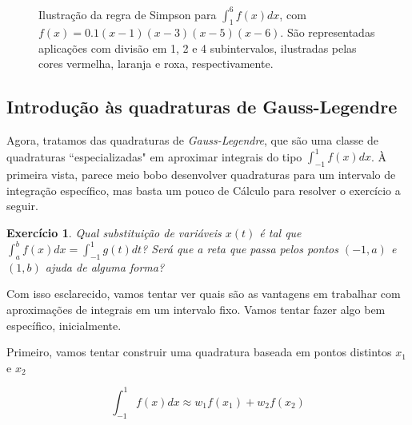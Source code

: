 \documentclass[]{article}
\newtheorem{exercicio}{Exercício}
\numberwithin{equation}{section}
\begin{document}
\begin{figure}
{
  }
  \caption{Ilustração da regra de Simpson para $\int_1^6 f(x)dx$, com
    $f(x) = 0.1(x - 1)(x - 3)(x - 5)(x - 6)$.  São representadas
    aplicações com divisão em 1, 2 e 4 subintervalos, ilustradas pelas
    cores vermelha, laranja e roxa, respectivamente.}
\end{figure}

\subsection{Introdução às quadraturas de Gauss-Legendre}

Agora, tratamos das quadraturas de \emph{Gauss-Legendre}, que são uma
classe de quadraturas ``especializadas" em aproximar integrais do tipo
$\int_{-1}^{1} f(x) dx$. À primeira vista, parece meio bobo
desenvolver quadraturas para um intervalo de integração específico,
mas basta um pouco de Cálculo para resolver o exercício a seguir.

\begin{exercicio}
  Qual substituição de variáveis $x(t)$ é tal que
  $\int_{a}^{b} f(x) dx = \int_{-1}^{1} g(t) dt$? Será que a reta que
  passa pelos pontos $(-1, a)$ e $(1, b)$ ajuda de alguma forma?
\end{exercicio}

Com isso esclarecido, vamos tentar ver quais são as vantagens em
trabalhar com aproximações de integrais em um intervalo fixo. Vamos
tentar fazer algo bem específico, inicialmente.

Primeiro, vamos tentar construir uma quadratura baseada em pontos
distintos $x_1$ e $x_2$

$$
\int_{-1}^{1} f(x) dx \approx w_1 f(x_1) + w_2 f(x_2)
$$
\end{document}
